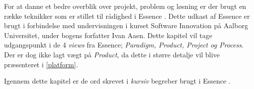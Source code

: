 For at danne et bedre overblik over projekt, problem og løsning er der brugt en række teknikker som er stillet til rådighed i Essence \citep{art:essence}.
Dette udkast af Essence er brugt i forbindelse med undervisningen i kurset Software Innovation på Aalborg Universitet, under bogens forfatter Ivan Aaen.
Dette kapitel vil tage udgangspunkt i de 4 \textit{views} fra Essence; \textit{Paradigm, Product, Project og Process}.
Der er dog ikke lagt vægt på \textit{Product}, da dette i større detalje vil blive præsenteret i \cref{platform}.

Igennem dette kapitel er de ord skrevet i \textit{kursiv} begreber brugt i Essence \citep{art:essence}.

